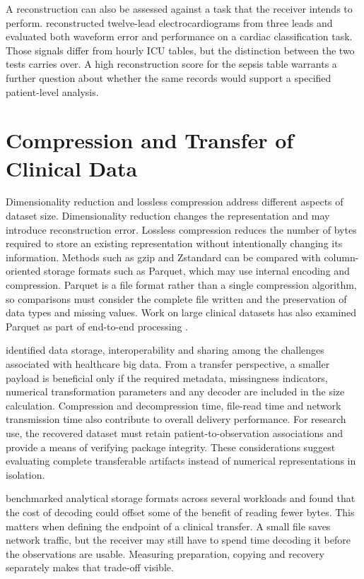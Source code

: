 \noindent A reconstruction can also be assessed against a task that the receiver intends to perform. \citet{Guan2026} reconstructed twelve-lead electrocardiograms from three leads and evaluated both waveform error and performance on a cardiac classification task. Those signals differ from hourly ICU tables, but the distinction between the two tests carries over. A high reconstruction score for the sepsis table warrants a further question about whether the same records would support a specified patient-level analysis.

\section{Compression and Transfer of Clinical
	Data}\label{compression-and-transfer-of-clinical-data}

Dimensionality reduction and lossless compression address different
aspects of dataset size. Dimensionality reduction changes the
representation and may introduce reconstruction error. Lossless
compression reduces the number of bytes required to store an existing
representation without intentionally changing its information. Methods
such as gzip and Zstandard \citep{Deutsch1996,Collet2021} can be compared with column-oriented storage
formats such as Parquet, which may use internal encoding and
compression. Parquet is a file format rather than a single compression
algorithm, so comparisons must consider the complete file written and
the preservation of data types and missing values. Work on large clinical datasets has also examined Parquet as part of end-to-end processing \citep{Lee2026}.

\noindent \citet{Hong2018} identified data storage, interoperability and sharing
among the challenges associated with healthcare big data. From a
transfer perspective, a smaller payload is beneficial only if the
required metadata, missingness indicators, numerical transformation
parameters and any decoder are included in the size calculation.
Compression and decompression time, file-read time and network
transmission time also contribute to overall delivery performance. For
research use, the recovered dataset must retain patient-to-observation
associations and provide a means of verifying package integrity. These
considerations suggest evaluating complete transferable artifacts
instead of numerical representations in isolation.

\noindent \citet{Liu2025} benchmarked analytical storage formats across several workloads and found that the cost of decoding could offset some of the benefit of reading fewer bytes. This matters when defining the endpoint of a clinical transfer. A small file saves network traffic, but the receiver may still have to spend time decoding it before the observations are usable. Measuring preparation, copying and recovery separately makes that trade-off visible.

